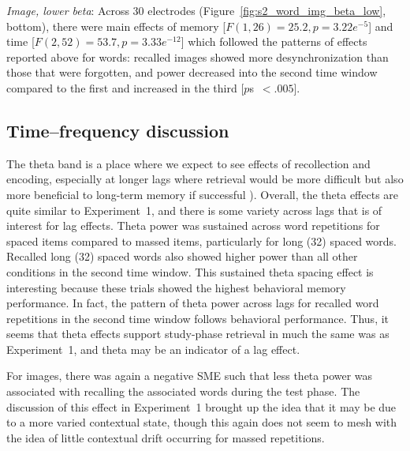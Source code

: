 \textit{Image, lower beta}: Across 30 electrodes (Figure~\ref{fig:s2_word_img_beta_low}, bottom), there were main effects of memory [$F(1,26)=25.2, p=3.22e^{-5}$] and time [$F(2,52)=53.7, p=3.33e^{-12}$] which followed the patterns of effects reported above for words: recalled images showed more desynchronization than those that were forgotten, and power decreased into the second time window compared to the first and increased in the third [$p$s~$<.005$].

\subsection{Time--frequency discussion}


The theta band is a place where we expect to see effects of recollection and encoding,
especially at longer lags where retrieval would be more difficult but also more beneficial to long-term memory if successful
\cite{DelaEtal2010,PavlAnde2005}).
Overall, the theta effects are quite similar to Experiment~1, and there is some variety across lags that is of interest for lag effects.
Theta power was sustained across word repetitions for spaced items compared to massed items, particularly for long (32) spaced words.  Recalled long (32) spaced words also showed higher power than all other conditions in the second time window.
This sustained theta spacing effect is interesting because these trials showed the highest behavioral memory performance.  In fact, the pattern of theta power across lags for recalled word repetitions in the second time window follows behavioral performance.  Thus, it seems that theta effects support study-phase retrieval in much the same was as Experiment~1, and theta may be an indicator of a lag effect.

For images, there was again a negative SME such that less theta power was associated with recalling the associated words during the test phase.  The discussion of this effect in Experiment~1 brought up the idea that it may be due to a more varied contextual state, though this again does not seem to mesh with the idea of little contextual drift occurring for massed repetitions.


